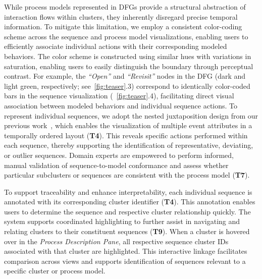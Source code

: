 \documentclass[preprint,journal]{vgtc}            %
\begin{document}
While process models represented in DFGs provide a structural abstraction of interaction flows within clusters, they inherently disregard precise temporal information.
To mitigate this limitation, we employ a consistent color-coding scheme across the sequence and process model visualizations, enabling users to efficiently associate individual actions with their corresponding modeled behaviors.
The color scheme is constructed using similar hues with variations in saturation, enabling users to easily distinguish the boundary through perceptual contrast.
For example, the \textit{``Open''} and \textit{``Revisit''} nodes in the DFG (dark and light green, respectively; see~\cref{fig:teaser}.3) correspond to identically color-coded bars in the sequence visualization (~\cref{fig:teaser}.4), facilitating direct visual association between modeled behaviors and individual sequence actions.
To represent individual sequences, we adopt the nested juxtaposition design from our previous work~\cite{Yu25Revealing}, which enables the visualization of multiple event attributes in a temporally ordered layout (\textbf{T4}). 
This reveals specific actions performed within each sequence, thereby supporting the identification of representative, deviating, or outlier sequences.
Domain experts are empowered to perform informed, manual validation of sequence-to-model conformance and assess whether particular subclusters or sequences are consistent with the process model (\textbf{T7}).

To support traceability and enhance interpretability, each individual sequence is annotated with its corresponding cluster identifier (\textbf{T4}).
This annotation enables users to determine the sequence and respective cluster relationship quickly.
The system supports coordinated highlighting to further assist in navigating and relating clusters to their constituent sequences (\textbf{T9}).
When a cluster is hovered over in the \textit{Process Description Pane}, all respective sequence cluster IDs associated with that cluster are highlighted.
This interactive linkage facilitates comparison across views and supports identification of sequences relevant to a specific cluster or process model.
\end{document}

